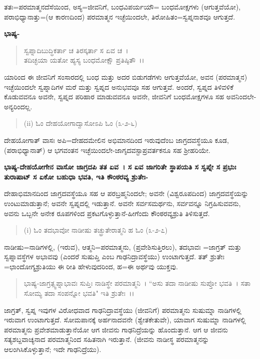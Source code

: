 ತತಃ=ಪರಮಾತ್ಮನದೆಸೆಯಿಂದ, ಅಸ್ಯ=ಜೀವನಿಗೆ, ಬಂಧವಿಪರ್ಯಯೌ= ಬಂಧಮೋಕ್ಷಗಳು (ಆಗುತ್ತವೆಯೋ), ಪರಾಭಿಧ್ಯಾನಾತ್ತು=(ಆ ಕಾರಣದಿಂದ) ಪರಮಾತ್ಮನ ಇಚ್ಛೆಯಿಂದಲೇ, ತಿರೋಹಿತಂ=ಸ್ವಪ್ನನಾಶವೂ ಆಗುತ್ತದೆ.

\noindent
\textbf{ಭಾಷ್ಯ-}

\begin{verse}
ಸ್ವಪ್ನಾದಿಬುದ್ಧಿಕರ್ತಾ ಚ ತಿರಸ್ಕರ್ತಾ ಸ ಏವ ಚ~।\\ ತದಿಚ್ಛಯಾ ಯತೋ ಹ್ಯಸ್ಯ ಬಂಧಮೋಕ್ಷೌ ಪ್ರತಿಷ್ಠಿತೌ~।।
\end{verse}


ಯಾರಿಂದ ಈ ಜೀವನಿಗೆ ಸಂಸಾರದಲ್ಲಿ ಬಂಧ ಮತ್ತು ಅದರ ಬಿಡುಗಡೆಗಳು ಆಗುತ್ತವೆಯೋ, ಅವನ (ಪರಮಾತ್ಮನ) ಇಚ್ಛೆಯಿಂದಲೇ ಸ್ವಪ್ನಾದಿಗಳ ಮರೆ ಮತ್ತು ಸ್ವಪ್ನದ ಅನುಭವವೂ ಸಹ ಆಗುತ್ತವೆ. ಅಂದರೆ, ಸ್ವಪ್ನದ ತಿಳಿವಳಿಕೆ ಕೊಡುವವನೂ ಅವನೇ, ಸ್ವಪ್ನದ ಪರಿಹಾರ ಮಾಡುವವನೂ ಅವನೇ, ಜೀವನಿಗೆ ಬಂಧಮೋಕ್ಷಗಳೂ ಸಹ ಅವನಿಂದಲೇ-ಅನ್ಯರಿಂದಲ್ಲ.

\begin{verse}
(ii) ಓಂ ದೇಹಯೋಗಾದ್ವಾಸೋಽಪಿ ಓಂ (೩-೨-೬)
\end{verse}

ದೇಹಯೋಗಾತ್ ವಾಸಃ ಅಪಿ=ದೇಹದಮೇಲಿನ ಅಭಿಮಾನದಿಂದ ಇರುವುದೆಂಬ ಜಾಗ್ರದವಸ್ಥೆಯೂ ಕೂಡ, (ಪರಾಭಿಧ್ಯಾನಾತ್) ಆ ಭಗವಂತನ ಇಚ್ಛೆಯಿಂದಲೇ-ಜಾಗೃದವಸ್ಟಾಪ್ರವರ್ತಕನೂ ಸಹ ಶ‍್ರೀಹರಿಯೇ.

\textbf{ಭಾಷ್ಯ-ದೇಹಯೋಗೇನ ವಾಸೋ ಜಾಗ್ರದಪಿ ತತ ಏವ~। ಸ ಏವ ಜಾಗರಿತೇ ಸ್ಥಾಪಯತಿ ಸ ಸ್ವಪ್ನೇ ಸ ಪ್ರಭುಃ ತುರಾಷಾಟ್ ಸ ಏಕೋ ಬಹುಧಾ ಭವತಿ, ಇತಿ ಕೌಂಠರವ್ಯ ಶ್ರುತೇಃ-}

ದೇಹಾಭಿಮಾನದಿಂದ ಜಾಗ್ರದವಸ್ಥೆಯೂ ಸಹ ಆ ಪರಬ್ರಹ್ಮನಿಂದಲೇ; ಅವನೇ (ವಿಶ್ವರೂಪದಿಂದ) ಜಾಗ್ರದವಸ್ಥೆಯನ್ನು ಉಂಟುಮಾಡುತ್ತಾನೆ; ಅವನೇ ಸ್ವಪ್ನದಲ್ಲಿ ಇಡುತ್ತಾನೆ. ಅವನೇ ಸರ್ವಸಮರ್ಥನು, ಸರ್ವವನ್ನೂ ನಿಗ್ರಹಿಸುವವನು, ಅವನು ಒಬ್ಬನೇ ಅನೇಕ ರೂಪಗಳಿಂದ ಪ್ರಕಟಗೊಳ್ಳುತ್ತಾನೆ-ಹೀಗೆಂದು ಕೌಂಠರವ್ಯಶ್ರುತಿ ತಿಳಿಸುತ್ತದೆ.

\begin{verse}
(i) ಓಂ ತದಭಾವೋ ನಾಡೀಷು ತಚ್ಛ್ರುತೇರಾತ್ಮನಿ ಹ ಓಂ (೩-೨-೭)
\end{verse}

ನಾಡೀಷು=ನಾಡಿಗಳಲ್ಲಿ, (ಇರುವ), ಆತ್ಮನಿ=ಪರಮಾತ್ಮನು, (ಪ್ರವೇಶಿಸುತ್ತಿರಲು), ತದಭಾವಃ =ಜಾಗ್ರತ್ ಮತ್ತು ಸ್ವಪ್ನಾವಸ್ಥೆಗಳ ಅಭಾವವು (ಎಂದರೆ ಸುಷುಪ್ತಿ ಎಂಬ ಗಾಢನಿದ್ರಾವಸ್ಥೆಯು) ಉಂಟಾಗುತ್ತದೆ. ತತ್ ಶ್ರುತೇಃ =ಛಾಂದೋಗ್ಯಶ್ರುತಿಯು ಈ ರೀತಿ ಹೇಳುವುದರಿಂದ, ಹ=ಈ ಅರ್ಥವು ಯುಕ್ತವು.

\begin{verse}
ಭಾಷ್ಯ-ಜಾಗ್ರತ್ಸ್ವಪ್ನಾಭಾವಃ ಸುಪ್ತಿಃ ನಾಡಿಸ್ಥೇ ಪರಮಾತ್ಮನಿ~। ``ಅಸು ತದಾ ನಾಡೀಷು ಸುಪ್ತೋ ಭವತಿ~। ಸತಾ ಸೋಮ್ಯ ತದಾ ಸಂಪನ್ನೋ ಭವತಿ" ಇತಿ ಶ್ರುತೇಃ~।।
\end{verse}

ಜಾಗ್ರತ್, ಸ್ವಪ್ನ ಇವುಗಳ ವಿರೋಧವಾದ ಗಾಢನಿದ್ರಾವಸ್ಥೆಯು (ಜೀವನಿಗೆ) ಪರಮಾತ್ಮನು ಸುಷುಮ್ನಾ ನಾಡಿಗಳಲ್ಲಿ ಇರುವಾಗ ಉಂಟಾಗುತ್ತದೆ. ಸೋಮಪಾನಕ್ಕೆ ಅರ್ಹನಾದವನೇ (ಶ್ವೇತಕೇತುವೇ), ಯಾವಾಗ ಸುಷುಮ್ನಾ ನಾಡಿಗಳಲ್ಲಿ ಪರಮಾತ್ಮನು ಪ್ರವೇಶಮಾಡುತ್ತಾನೆಯೋ ಆಗ ಜೀವನು ಗಾಢನಿದ್ರೆಯನ್ನು ಹೊಂದುತ್ತಾನೆ. ಆಗ ಆ ಜೀವನು ಸತ್ಯಶಬ್ದವಾಚ್ಯನಾದ ಪರಮಾತ್ಮನಿಂದ ಸಹಿತನಾಗಿ ಇರುತ್ತಾನೆ. (ಜೀವನು ನಾಡೀಸ್ಥ ಪರಮಾತ್ಮನನ್ನು ಆಲಂಗಿಸಿಕೊಳ್ಳುತ್ತಾನೆ; ಇದೇ ಗಾಢನಿದ್ರೆಯು).

